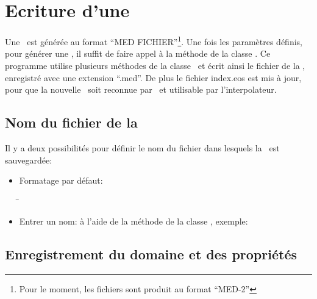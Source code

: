     \section{Ecriture d'une \bdd}\label{ebdd}
    
    Une \bdd\ est générée au format ``MED FICHIER''\footnote{Pour le moment, les fichiers sont produit au format ``MED-2''}.
    Une fois les paramètres définis, pour générer une \bdd, il suffit de faire 
    appel à la méthode  de la classe \IGEN.
    Ce programme utilise plusieurs méthodes de la classe \MED\ et écrit ainsi le fichier de
    la \bdd, enregistré avec une extension ``.med''. 
    De plus le fichier index.eos est mis à jour, pour que la nouvelle \bdd\ soit reconnue par \EOS\ et utilisable par l'interpolateur.
    
      \subsection{Nom du fichier de la \bdd}
      
      Il y a deux possibilités pour définir le nom du fichier dans lesquels la \bdd\ est sauvegardée:
      \vspace{0.3cm}
      \begin{itemize}\itemsep0.3cm
       \item Formatage par défaut:
       \smallbreak
       \begin{tabbing}
       \hspace{-0.5cm} \= \kill
       \> 
       \end{tabbing}
       
       \item Entrer un nom: à l'aide de la méthode  de la classe \IGEN, exemple:
       
      \end{itemize}
      \vspace{0.5cm}
      
      
      \subsection{Enregistrement du domaine et des propriétés}
      
